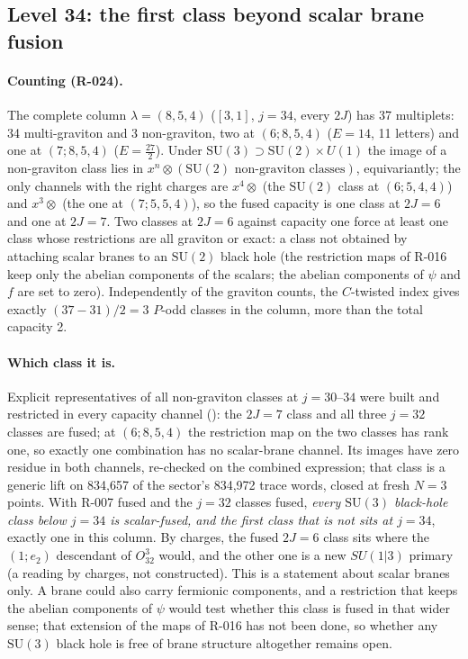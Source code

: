 \documentclass[11pt]{article}
\newcommand{\file}[1]{\path{#1}}
\newcommand{\R}[1]{\textsf{R-0#1}}
\newcommand{\SU}{\mathrm{SU}}
\begin{document}
\subsection{Level 34: the first class beyond scalar brane fusion}\label{sec:su3core}

\paragraph{Counting (\R{24}).} The complete column $\lambda=(8,5,4)$ ($[3,1]$, $j=34$, every $2J$) has 37 multiplets:
34 multi-graviton and 3 non-graviton, two at $(6;8,5,4)$ ($E=14$, 11 letters) and one at $(7;8,5,4)$
($E=\tfrac{27}{2}$). Under $\SU(3)\supset\SU(2)\times U(1)$ the image of a non-graviton class lies in
$x^n\otimes(\text{$\SU(2)$ non-graviton classes})$, equivariantly; the only channels with the right charges are
$x^4\otimes$ (the $\SU(2)$ class at $(6;5,4,4)$) and $x^3\otimes$ (the one at $(7;5,5,4)$), so the fused capacity is
one class at $2J=6$ and one at $2J=7$. Two classes at $2J=6$ against capacity one force at least one class whose
restrictions are all graviton or exact: a class not obtained by attaching scalar branes to an $\SU(2)$ black hole (the
restriction maps of \R{16} keep only the abelian components of the scalars; the abelian components of $\psi$ and $f$
are set to zero).
Independently of the graviton counts, the $C$-twisted index gives exactly $(37-31)/2=3$ $P$-odd classes in the
column, more than the total capacity 2.

\paragraph{Which class it is.} Explicit representatives of all non-graviton classes at $j=30$--$34$ were built
and restricted in every capacity channel (\file{data/su3/core_restrictions_j30_j34.json}): the $2J=7$ class and all
three $j=32$ classes are fused; at $(6;8,5,4)$ the restriction map on the two classes has rank one, so exactly one
combination has no scalar-brane channel. Its images have zero residue in both channels, re-checked on the combined
expression; that class is a generic lift on 834{,}657 of the sector's 834{,}972 trace words, closed at fresh $N=3$
points. With \R{07} fused and the $j=32$ classes fused, \emph{every $\SU(3)$ black-hole class below $j=34$ is
scalar-fused, and the first class that is not sits at $j=34$}, exactly one in this column. By charges, the fused $2J=6$
class sits where the $(1;e_2)$ descendant of $O^3_{32}$ would, and the other one is a new $SU(1|3)$ primary (a reading
by charges, not constructed). This is a statement about scalar branes only. A brane could also carry fermionic
components, and a restriction that keeps the abelian components of $\psi$ would test whether this class is fused in
that wider sense; that extension of the maps of \R{16} has not been done, so whether any $\SU(3)$ black hole is free
of brane structure altogether remains open.
\end{document}
